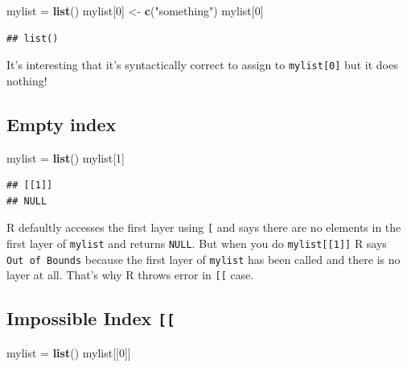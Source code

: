 \documentclass[]{book}
\newenvironment{Shaded}{\begin{snugshade}}{\end{snugshade}}
\newcommand{\DecValTok}[1]{\textcolor[rgb]{0.00,0.00,0.81}{#1}}
\newcommand{\KeywordTok}[1]{\textcolor[rgb]{0.13,0.29,0.53}{\textbf{#1}}}
\newcommand{\NormalTok}[1]{#1}
\newcommand{\StringTok}[1]{\textcolor[rgb]{0.31,0.60,0.02}{#1}}
\begin{document}
\begin{Shaded}
\begin{Highlighting}[]
\NormalTok{mylist =}\StringTok{ }\KeywordTok{list}\NormalTok{()}
\NormalTok{mylist[}\DecValTok{0}\NormalTok{] <-}\StringTok{ }\KeywordTok{c}\NormalTok{(}\StringTok{"something"}\NormalTok{)}
\NormalTok{mylist[}\DecValTok{0}\NormalTok{]}
\end{Highlighting}
\end{Shaded}

\begin{verbatim}
## list()
\end{verbatim}

It's interesting that it's syntactically correct to assign to \texttt{mylist{[}0{]}} but it does nothing!

\hypertarget{empty-index}{%
\subsection*{Empty index}\label{empty-index}}

\begin{Shaded}
\begin{Highlighting}[]
\NormalTok{mylist =}\StringTok{ }\KeywordTok{list}\NormalTok{()}
\NormalTok{mylist[}\DecValTok{1}\NormalTok{]}
\end{Highlighting}
\end{Shaded}

\begin{verbatim}
## [[1]]
## NULL
\end{verbatim}

R defaultly accesses the first layer using \texttt{{[}} and says there are no elements in the first layer of \texttt{mylist} and returns \texttt{NULL}. But when you do \texttt{mylist{[}{[}1{]}{]}} R says \texttt{Out\ of\ Bounds} because the first layer of \texttt{mylist} has been called and there is no layer at all. That's why R throws error in \texttt{{[}{[}} case.

\hypertarget{impossible-index}{%
\subsection*{\texorpdfstring{Impossible Index \texttt{{[}{[}}}{Impossible Index {[}{[}}}\label{impossible-index}}
\addcontentsline{toc}{subsection}{Impossible Index \texttt{{[}{[}}}

\begin{Shaded}
\begin{Highlighting}[]
\NormalTok{mylist =}\StringTok{ }\KeywordTok{list}\NormalTok{()}
\NormalTok{mylist[[}\DecValTok{0}\NormalTok{]]}
\end{Highlighting}
\end{Shaded}
\end{document}
